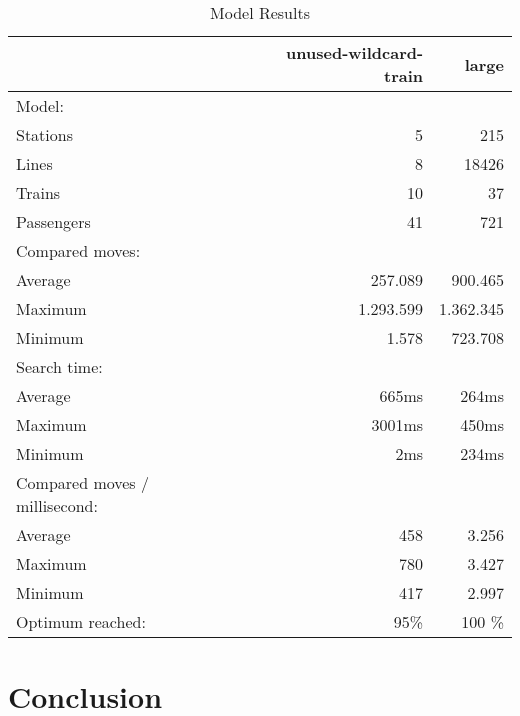 \documentclass[a4paper,10pt,parskip]{article}
\begin{document}
\begin{table}[ht]
\caption{Model Results}
\label{table:results}
\begin{tabular}{ l r r }
    \hline\hline
        & unused-wildcard-train & large \\ 
    \hline
    Model: &  & \\[3pt]
    \hspace{3mm}Stations & 5 & 215 \\ 
    \hspace{3mm}Lines & 8 & 18426 \\ 
    \hspace{3mm}Trains & 10 & 37 \\ 
    \hspace{3mm}Passengers & 41 & 721 \\[3pt] 
    Compared moves: &  & \\[3pt]
    \hspace{3mm}Average & 257.089 & 900.465 \\ 
    \hspace{3mm}Maximum & 1.293.599 & 1.362.345 \\ 
    \hspace{3mm}Minimum & 1.578 & 723.708 \\ 
    Search time: &  & \\[3pt]
    \hspace{3mm}Average & 665ms & 264ms \\ 
    \hspace{3mm}Maximum & 3001ms & 450ms \\ 
    \hspace{3mm}Minimum & 2ms & 234ms \\ [3pt]
    Compared moves / millisecond: &  & \\ [3pt]
    \hspace{3mm}Average & 458 & 3.256 \\ 
    \hspace{3mm}Maximum & 780 & 3.427 \\ 
    \hspace{3mm}Minimum & 417 & 2.997 \\ [3pt] 
    Optimum reached: & 95\% & 100 \% \\ [3pt]
    \hline
\end{tabular}
\end{table}

\section{Conclusion}
\end{document}
